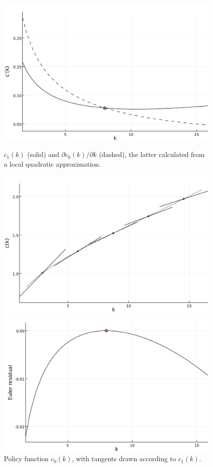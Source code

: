 \documentclass[a4paper,11pt]{article}
\newcommand{\figwidth}{\linewidth}
\begin{document}
\begin{figure}[b]
\begin{minipage}[t]{0.48\linewidth}
    \includegraphics[width=\figwidth]{../fig/cderiv-consistentfuture.pdf}
    \caption{$c_1(k)$ (solid) and $\partial c_0(k)/ \partial k$ (dashed), the latter calculated from a local quadratic approximation.}
    \label{fig:cderiv-consistentfuture}
  \end{minipage}\hfill%
  \begin{minipage}[t]{0.48\linewidth}
    \includegraphics[width=\figwidth]{../fig/ck-tangents-consistentfuture.pdf}
    \caption{Policy function $c_0(k)$, with tangents drawn according to $c_1(k)$.}
    \label{fig:policy-tangents}
  \end{minipage}
  \begin{minipage}[t]{0.48\linewidth}
    \includegraphics[width=\figwidth]{../fig/eulerresid-consistentfuture.pdf}

\end{minipage}
\end{figure}
\end{document}
